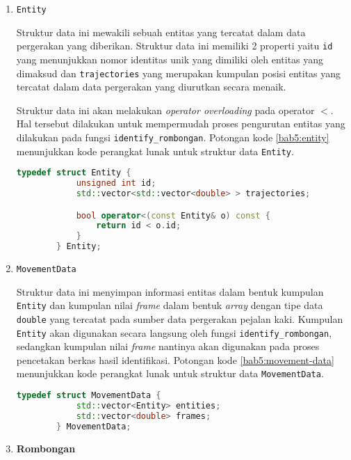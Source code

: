 \begin{enumerate}
    \item \texttt{Entity}
    
    Struktur data ini mewakili sebuah entitas yang tercatat dalam data pergerakan yang diberikan. Struktur data ini memiliki 2 properti yaitu \texttt{id} yang menunjukkan nomor identitas unik yang dimiliki oleh entitas yang dimaksud dan \texttt{trajectories} yang merupakan kumpulan posisi entitas yang tercatat dalam data pergerakan yang diurutkan secara menaik.
    
    Struktur data ini akan melakukan \textit{operator overloading} pada operator $<$. Hal tersebut dilakukan untuk mempermudah proses pengurutan entitas yang dilakukan pada fungsi \texttt{identify\_rombongan}. Potongan kode \ref{bab5:entity} menunjukkan kode perangkat lunak untuk struktur data \texttt{Entity}.
    
    \begin{lstlisting}[language=C++, caption=Implementasi \texttt{Entity}, label={bab5:entity}]
        typedef struct Entity {
            unsigned int id;
            std::vector<std::vector<double> > trajectories;

            bool operator<(const Entity& o) const {
                return id < o.id;
            }
        } Entity;
    \end{lstlisting}
    
    \item \texttt{MovementData}
    
    Struktur data ini menyimpan informasi entitas dalam bentuk kumpulan \texttt{Entity} dan kumpulan nilai \textit{frame} dalam bentuk \textit{array} dengan tipe data \texttt{double} yang tercatat pada sumber data pergerakan pejalan kaki. Kumpulan \texttt{Entity} akan digunakan secara langsung oleh fungsi \texttt{identify\_rombongan}, sedangkan kumpulan nilai \textit{frame} nantinya akan digunakan pada proses pencetakan berkas hasil identifikasi. Potongan kode \ref{bab5:movement-data} menunjukkan kode perangkat lunak untuk struktur data \texttt{MovementData}.
    
    \begin{lstlisting}[language=C++, caption=Implementasi \texttt{MovementData}, label={bab5:movement-data}]
        typedef struct MovementData {
            std::vector<Entity> entities;
            std::vector<double> frames;
        } MovementData;
    \end{lstlisting}
    
    \item \textbf{Rombongan}
    

\end{enumerate}
